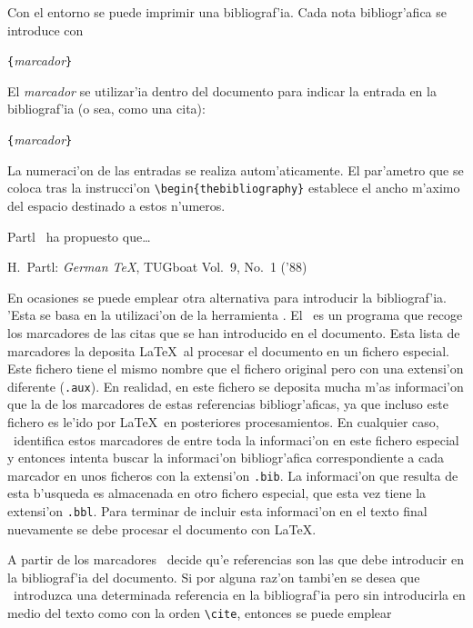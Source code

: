 Con el entorno  se puede imprimir una
bibliograf'ia. Cada nota bibliogr'afica se introduce con
\begin{command}
\verb|{|\emph{marcador}\verb|}|
\end{command}
El \emph{marcador} se utilizar'ia dentro del documento para indicar la
entrada en la bibliograf'ia (o sea, como una cita):
\begin{command}
\verb|{|\emph{marcador}\verb|}|
\end{command}
La numeraci'on de las entradas se realiza autom'aticamente. El
par'ametro que se coloca tras la instrucci'on
\verb|\begin{thebibliography}| establece el ancho m'aximo del espacio
  destinado a estos n'umeros.

\begin{example}
Partl~\cite{pa} ha 
propuesto que\ldots
 
\begin{thebibliography}{99}
 H.~Partl: 
\emph{German \TeX},
TUGboat Vol.~9, No.~1 ('88)
\end{thebibliography}
\end{example}
\thispagestyle{fancyplain}

En ocasiones se puede emplear otra alternativa para introducir la
bibliograf'ia. 'Esta se basa en la utilizaci'on de la herramienta
\BibTeX. El \BibTeX\ es un programa que recoge
los marcadores de las citas que se han introducido en el documento.
Esta lista de marcadores la deposita \LaTeX\ al procesar el documento
en un fichero especial. Este fichero tiene el mismo nombre que el
fichero original pero con una extensi'on diferente (\texttt{.aux}). En
realidad, en este fichero se deposita mucha m'as informaci'on que la
de los marcadores de estas referencias bibliogr'aficas, ya que incluso
este fichero es le'ido por \LaTeX\ en posteriores procesamientos. En
cualquier caso, \BibTeX\ identifica estos marcadores de entre toda la
informaci'on en este fichero especial y entonces intenta buscar la
informaci'on bibliogr'afica correspondiente a cada marcador en unos
ficheros con la extensi'on \texttt{.bib}. La informaci'on que resulta
de esta b'usqueda es almacenada en otro fichero especial, que esta vez
tiene la extensi'on \texttt{.bbl}. Para terminar de incluir esta
informaci'on en el texto final nuevamente se debe procesar el
documento con \LaTeX.

A partir de los marcadores \BibTeX\ decide qu'e referencias son las
que debe introducir en la bibliograf'ia del documento. Si por alguna
raz'on tambi'en se desea que \BibTeX\ introduzca una determinada
referencia en la bibliograf'ia pero sin introducirla en medio del
texto como con la orden \verb|\cite|, entonces se puede emplear

